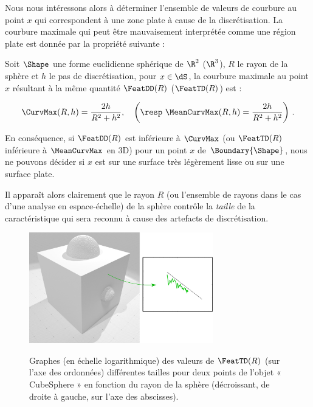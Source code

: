 Nous nous intéressons alors à déterminer l'ensemble de valeurs de courbure au
point $x$ qui correspondent à une zone plate à cause de la discrétisation. La
courbure maximale qui peut être mauvaisement interprétée comme une région plate
est donnée par la propriété suivante :

\begin{property}
  Soit $\Shape$ une forme euclidienne sphérique de $\R^2$
  (\resp $\R^3$), $R$ le rayon de la sphère et $h$ le pas de
  discrétisation, pour $x \in \dS$, la courbure maximale au point $x$ résultant
  à la même quantité $\FeatDD(R)$ (\resp $\FeatTD(R)$) est :

  \begin{equation}
    \CurvMax(R,h) = \frac{2h}{R^2+h^2},
    \quad\left(\text{\resp } \MeanCurvMax(R,h) = \frac{2h}{R^2+h^2}\right)\,.
  \end{equation}

  \label{prop:minInterval}
\end{property}

En conséquence, si $\FeatDD(R)$ est inférieure à $\CurvMax$ (ou $\FeatTD(R)$
inférieure à $\MeanCurvMax$ en 3D) pour un point $x$ de $\Boundary{\Shape}$, nous
ne pouvons décider si $x$ est sur une surface très légèrement lisse ou sur une
surface plate.

Il apparaît alors clairement que le rayon $R$ (ou l'ensemble de rayons dans le
cas d'une analyse en espace-échelle) de la sphère contrôle la \emph{taille} de la
caractéristique qui sera reconnu à cause des artefacts de discrétisation.

\begin{figure}[ht]
\begin{center}
  {\includegraphics[width=8cm]{figures/CubeSpherePlot_F_NoColor}}
  \caption{Graphes (en échelle logarithmique) des valeurs de $\FeatTD(R)$ (sur
  l'axe des ordonnées) différentes tailles pour deux points de l'objet «
  CubeSphere » en fonction du rayon de la sphère (décroissant, de droite
  à gauche, sur l'axe des abscisses).\label{fig:CubeSpherePlot_F_NoColor}}
\end{center}
\end{figure}

